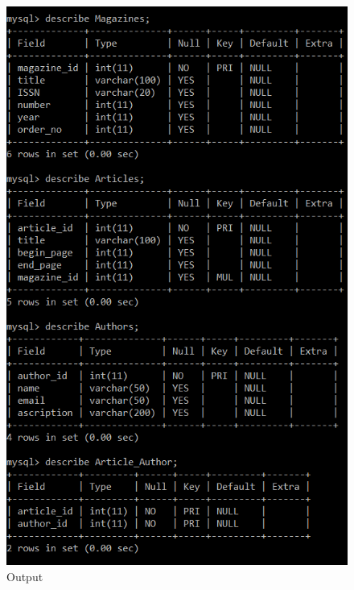 \documentclass{article}
\begin{document}
\begin{figure}[h]
\centering
\includegraphics[scale = 0.7]{5.PNG}
\caption{Output}
\end{figure}
\end{document}
